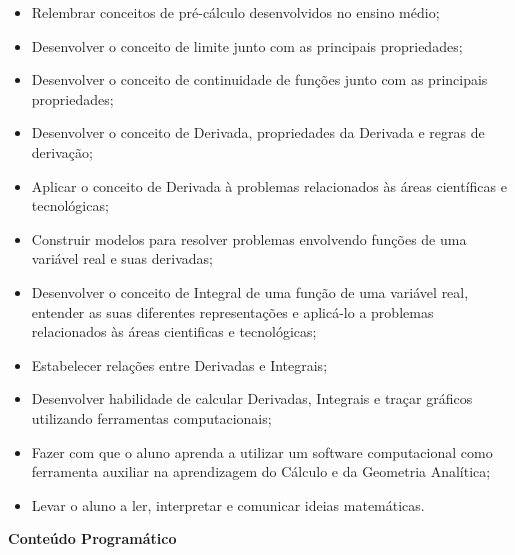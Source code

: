 \begin{itemize}

\item Relembrar conceitos de pré-cálculo desenvolvidos no ensino médio;
\item Desenvolver o conceito de limite junto com as principais propriedades;
\item Desenvolver o conceito de continuidade de funções junto com as principais propriedades;
\item Desenvolver o conceito de Derivada, propriedades da Derivada e regras de derivação;
\item Aplicar o conceito de Derivada à problemas relacionados às áreas científicas e tecnológicas;
\item Construir modelos para resolver problemas envolvendo funções de uma variável real e suas derivadas;
\item Desenvolver o conceito de Integral de uma função de uma variável real, entender as suas diferentes representações e aplicá-lo a problemas relacionados às áreas cientificas e tecnológicas;
\item Estabelecer relações entre Derivadas e Integrais;
\item Desenvolver habilidade de calcular Derivadas, Integrais e traçar gráficos utilizando ferramentas computacionais;
\item Fazer com que o aluno aprenda a utilizar um software computacional como ferramenta auxiliar na aprendizagem do Cálculo e da Geometria Analítica;
\item  Levar o aluno a ler, interpretar e comunicar ideias matemáticas.

\end{itemize} 


\begin{snugshade}\begin{center}\textbf{
    Conteúdo Programático
}\end{center}\end{snugshade}


